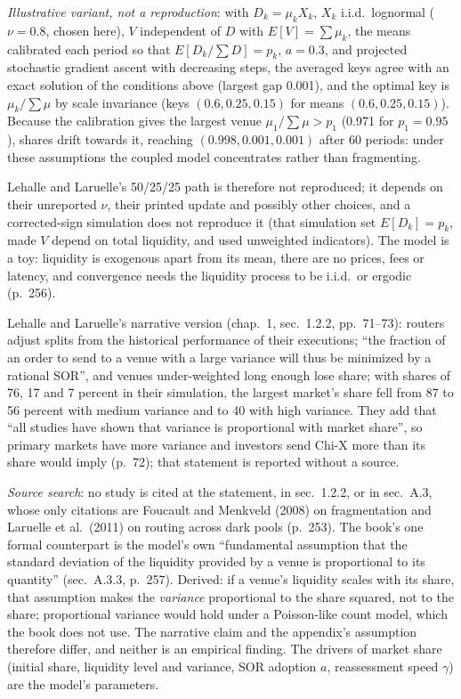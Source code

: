 \begin{qfmodel}
\emph{Illustrative variant, not a reproduction}: with $D_k=\mu_kX_k$, $X_k$ i.i.d.\ lognormal ($\nu=0.8$, chosen here), $V$ independent of $D$ with $E[V]=\sum\mu_k$, the means calibrated each period so that $E[D_k/\sum D]=p_k$, $a=0.3$, and projected stochastic gradient ascent with decreasing steps, the averaged keys agree with an exact solution of the conditions above (largest gap 0.001), and the optimal key is $\mu_k/\sum\mu$ by scale invariance (keys $(0.6,0.25,0.15)$ for means $(0.6,0.25,0.15)$). Because the calibration gives the largest venue $\mu_1/\sum\mu>p_1$ (0.971 for $p_1=0.95$), shares drift towards it, reaching $(0.998,0.001,0.001)$ after 60 periods: under these assumptions the coupled model concentrates rather than fragmenting.

Lehalle and Laruelle's 50/25/25 path is therefore not reproduced; it depends on their unreported $\nu$, their printed update and possibly other choices, and a corrected-sign simulation does not reproduce it (that simulation set $E[D_k]=p_k$, made $V$ depend on total liquidity, and used unweighted indicators). The model is a toy: liquidity is exogenous apart from its mean, there are no prices, fees or latency, and convergence needs the liquidity process to be i.i.d.\ or ergodic (p.~256).

 Lehalle and Laruelle's narrative version (chap.~1, sec.~1.2.2, pp.~71--73): routers adjust splits from the historical performance of their executions; ``the fraction of an order to send to a venue with a large variance will thus be minimized by a rational SOR'', and venues under-weighted long enough lose share; with shares of 76, 17 and 7 percent in their simulation, the largest market's share fell from 87 to 56 percent with medium variance and to 40 with high variance. They add that ``all studies have shown that variance is proportional with market share'', so primary markets have more variance and investors send Chi-X more than its share would imply (p.~72); that statement is reported without a source.

\emph{Source search}: no study is cited at the statement, in sec.~1.2.2, or in sec.~A.3, whose only citations are Foucault and Menkveld (2008) on fragmentation and Laruelle et al.\ (2011) on routing across dark pools (p.~253). The book's one formal counterpart is the model's own ``fundamental assumption that the standard deviation of the liquidity provided by a venue is proportional to its quantity'' (sec.~A.3.3, p.~257). Derived: if a venue's liquidity scales with its share, that assumption makes the \emph{variance} proportional to the share squared, not to the share; proportional variance would hold under a Poisson-like count model, which the book does not use. The narrative claim and the appendix's assumption therefore differ, and neither is an empirical finding. The drivers of market share (initial share, liquidity level and variance, SOR adoption $a$, reassessment speed $\gamma$) are the model's parameters.


\end{qfmodel}
